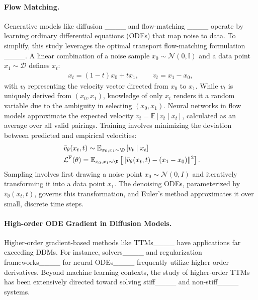 \paragraph{Flow Matching. }
Generative models like diffusion ____ and flow-matching ____ operate by learning ordinary differential equations (ODEs) that map noise to data. To simplify, this study leverages the optimal transport flow-matching formulation ____. A linear combination of a noise sample $x_0 \sim \mathcal{N}(0, \mathbb{I})$ and a data point $x_1 \sim \mathcal{D}$ defines $x_t$:
\begin{align*}
x_t = (1-t)x_0 + tx_1,
\qquad v_t = x_1 - x_0,
\end{align*}
with $v_t$ representing the velocity vector directed from $x_0$ to $x_1$. While $v_t$ is uniquely derived from $(x_0, x_1)$, knowledge of only $x_t$ renders it a random variable due to the ambiguity in selecting $(x_0, x_1)$. Neural networks in flow models approximate the expected velocity $\bar{v}_t = \mathbb{E}[v_t \mid x_t]$, calculated as an average over all valid pairings. Training involves minimizing the deviation between predicted and empirical velocities:
\begin{align}\label{eq:flow-matching}
& ~ \notag \bar{v}_\theta(x_t, t) \sim \mathbb{E}_{x_0,x_1 \sim \D} \left[ v_t \mid x_t \right] \\ 
& ~ \mathcal{L}^{\mathrm{F}}(\theta) = \mathbb{E}_{x_0,x_1 \sim \D} \left[ \| \bar{v}_\theta(x_t, t) - (x_1-x_0) \|^2 \right].
\end{align}
Sampling involves first drawing a noise point $x_0 \sim \mathcal{N}(0, I)$ and iteratively transforming it into a data point $x_1$. The denoising ODEs, parameterized by $\bar{v}_\theta(x_t, t)$, governs this transformation, and Euler’s method approximates it over small, discrete time steps.

\paragraph{High-order ODE Gradient in Diffusion Models. }

Higher-order gradient-based methods like TTMs____ have applications far exceeding DDMs. For instance, solvers____ and regularization frameworks____ for neural ODEs____ frequently utilize higher-order derivatives. Beyond machine learning contexts, the study of higher-order TTMs has been extensively directed toward solving stiff____ and non-stiff____ systems.